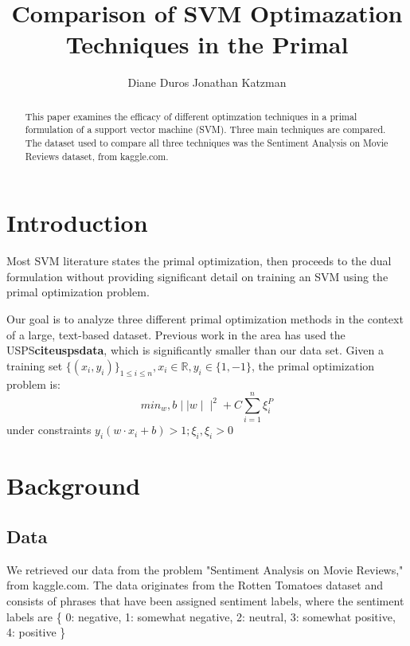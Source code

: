 \documentclass[letterpaper, 11pt]{article}
\title{Comparison of SVM Optimazation Techniques in the Primal}
\author{Diane Duros \And Jonathan Katzman}
\begin{document}
\maketitle

\begin{abstract}
This paper examines the efficacy of different optimzation techniques in a primal formulation of a support vector machine (SVM).  Three main techniques are compared.  The dataset used to compare all three techniques was the Sentiment Analysis on Movie Reviews dataset, from kaggle.com.
\end{abstract}
                                                                                                                                                                                                                                                                           
\section{Introduction}
Most SVM literature states the primal optimization, then proceeds to the dual formulation without providing significant detail on training an SVM using the primal optimization problem.  

Our goal is to analyze three different primal optimization methods in the context of a large, text-based dataset.  Previous work in the area\cite{chapelle2007training} has used the USPS\textbf{cite{uspsdata}}, which is significantly smaller than our data set.  Given a training set $\{ (x_i, y_i) \}_{1\le i\le n}, x_i \in \mathbb{R}, y_i \in \{1, -1\} $, the primal optimization problem is:
$$ min_w,b \mid \mid w \mid \mid ^2 + C\sum_{i=1}^n \xi_i^P $$
under constraints $y_i(w\cdot x_i + b) > 1; \xi_i, \xi_i > 0$

\section{Background}

\subsection{Data}
We retrieved our data from the problem "Sentiment Analysis on Movie Reviews," from kaggle.com.  The data originates from the Rotten Tomatoes dataset and consists of phrases that have been assigned sentiment labels, where the sentiment labels are \{ 0: negative, 1: somewhat negative, 2: neutral, 3: somewhat positive, 4: positive \}
\end{document}
